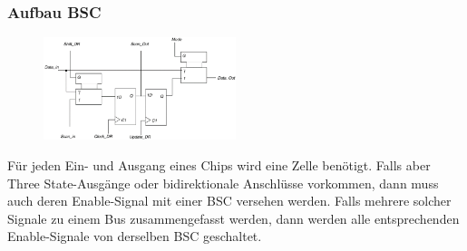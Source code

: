 \subsubsection{Aufbau BSC}
\begin{multicols}{2}
\begin{figure}[H]
    \includegraphics[width=0.5\textwidth]{images/bst_bsc.png}
\end{figure}
Für jeden Ein- und Ausgang eines Chips wird eine Zelle benötigt. Falls aber Three State-Ausgänge oder bidirektionale Anschlüsse vorkommen, dann muss auch deren Enable-Signal mit einer BSC versehen werden. Falls mehrere solcher Signale zu einem Bus zusammengefasst werden, dann werden alle entsprechenden Enable-Signale von derselben BSC geschaltet.
\end{multicols}